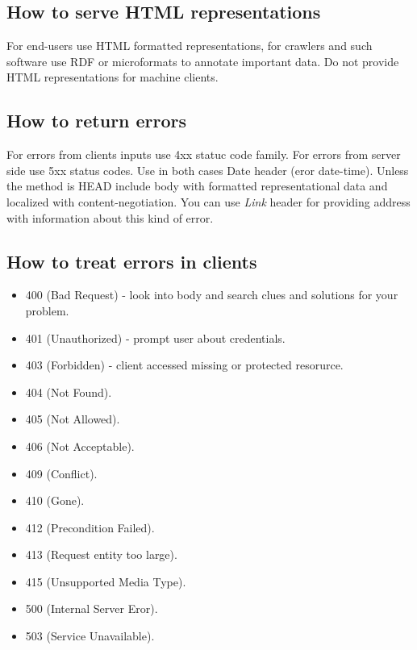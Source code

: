 \documentclass[11pt,a4paper]{article}
\begin{document}
\subsection{How to serve HTML representations}
For end-users use HTML formatted representations, for crawlers and such software use RDF or microformats to annotate important data. Do not provide HTML representations for machine clients.

\subsection{How to return errors}
For errors from clients inputs use 4xx statuc code family. For errors from server side use 5xx status codes. Use in both cases Date header (eror date-time). Unless the method is HEAD include body with formatted representational data and localized with content-negotiation. You can use \textit{Link} header for providing address with information about this kind of error.

\subsection{How to treat errors in clients}
\begin{itemize}
	\item 400 (Bad Request) - look into body and search clues and solutions for your problem.
	\item 401 (Unauthorized) - prompt user about credentials.
	\item 403 (Forbidden) - client accessed missing or protected resorurce.
	\item 404 (Not Found).
	\item 405 (Not Allowed).
	\item 406 (Not Acceptable).
	\item 409 (Conflict).
	\item 410 (Gone).
	\item 412 (Precondition Failed).
	\item 413 (Request entity too large).
	\item 415 (Unsupported Media Type).
	\item 500 (Internal Server Eror).
	\item 503 (Service Unavailable).
\end{itemize}
\end{document}
